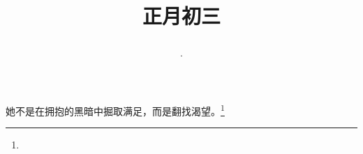 \title{\date[d=12,m=2,y=2024][year:cn-y,年,month:cn,day:cn,日,·,weekday]·正月初三 }
她不是在拥抱的黑暗中掘取满足，而是翻找渴望。\footnote{ }

